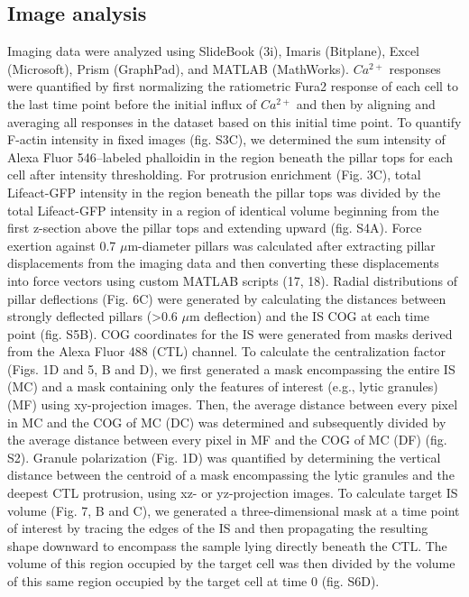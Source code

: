 \subsection{Image analysis}
Imaging data were analyzed using SlideBook (3i), Imaris (Bitplane), Excel (Microsoft), Prism (GraphPad), and MATLAB (MathWorks). $Ca^{2+}$ responses were quantified by first normalizing the ratiometric Fura2 response of each cell to the last time point before the initial influx of $Ca^{2+}$ and then by aligning and averaging all responses in the dataset based on this initial time point. To quantify F-actin intensity in fixed images (fig. S3C), we determined the sum intensity of Alexa Fluor 546–labeled phalloidin in the region beneath the pillar tops for each cell after intensity thresholding. For protrusion enrichment (Fig. 3C), total Lifeact-GFP intensity in the region beneath the pillar tops was divided by the total Lifeact-GFP intensity in a region of identical volume beginning from the first z-section above the pillar tops and extending upward (fig. S4A). Force exertion against 0.7 $\mu$m-diameter pillars was calculated after extracting pillar displacements from the imaging data and then converting these displacements into force vectors using custom MATLAB scripts (17, 18). Radial distributions of pillar deflections (Fig. 6C) were generated by calculating the distances between strongly deflected pillars (>0.6 $\mu$m deflection) and the IS COG at each time point (fig. S5B). COG coordinates for the IS were generated from masks derived from the Alexa Fluor 488 (CTL) channel. To calculate the centralization factor (Figs. 1D and 5, B and D), we first generated a mask encompassing the entire IS (MC) and a mask containing only the features of interest (e.g., lytic granules) (MF) using xy-projection images. Then, the average distance between every pixel in MC and the COG of MC (DC) was determined and subsequently divided by the average distance between every pixel in MF and the COG of MC (DF) (fig. S2). Granule polarization (Fig. 1D) was quantified by determining the vertical distance between the centroid of a mask encompassing the lytic granules and the deepest CTL protrusion, using xz- or yz-projection images. To calculate target IS volume (Fig. 7, B and C), we generated a three-dimensional mask at a time point of interest by tracing the edges of the IS and then propagating the resulting shape downward to encompass the sample lying directly beneath the CTL. The volume of this region occupied by the target cell was then divided by the volume of this same region occupied by the target cell at time 0 (fig. S6D).

